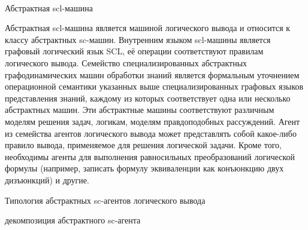 \begin{frame}{\\Абстрактная scl-машина}
\topline
\justifying
\vspace{10mm}
 
Абстрактная scl-машина является машиной логического вывода и относится к классу абстрактных sc-машин. Внутренним языком scl-машины является графовый логический язык SCL, её операции соответствуют правилам логического вывода. Семейство специализированных абстрактных графодинамических машин обработки знаний является формальным уточнением операционной семантики указанных выше специализированных графовых языков представления знаний, каждому из которых соответствует одна или несколько абстрактных машин. Эти абстрактные машины соответствуют различным моделям решения задач, логикам, моделям правдоподобных рассуждений. Агент из семейства агентов логического вывода может представлять собой какое-либо правило вывода, применяемое для решения логической задачи. Кроме того, необходимы агенты для выполнения равносильных преобразований логической формулы (например, записать формулу эквиваленции как конъюнкцию двух дизъюнкций) и другие.
\end{frame}

\begin{frame}{Типология абстрактных sc-агентов логического вывода} 
\topline
\justifying
\vspace{10mm}

\begin{SCn}
\begin{scnrelfromset}{декомпозиция абстрактного sc-агента}
\end{scnrelfromset}
\begin{scnindent}
\end{scnindent}
\end{SCn}
\end{frame}

